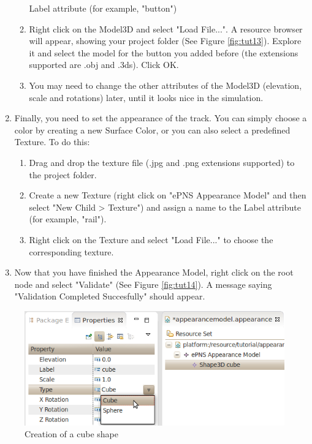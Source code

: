 \begin{enumerate}
\begin{enumerate}
    Label attribute (for example, "button")
    \item Right click on the Model3D and select "Load File...". A resource browser will appear, showing your project folder (See Figure 
    \ref{fig:tut13}). Explore it and select the model for the button you added before (the extensions supported are .obj and .3ds). Click OK.
    \item You may need to change the other attributes of the Model3D (elevation, scale and rotations) later, until it looks nice in 
    the simulation.
  \end{enumerate}
  \item Finally, you need to set the appearance of the track. You can simply choose a color by creating a new Surface Color, or you can also
  select a predefined Texture. To do this: 
  \begin{enumerate}
    \item Drag and drop the texture file (.jpg and .png extensions supported) to the project folder.
    \item Create a new Texture (right click on "ePNS Appearance Model" and then select "New Child > Texture") and assign a name to the 
    Label attribute (for example, "rail").
    \item Right click on the Texture and select "Load File..." to choose the corresponding texture.
  \end{enumerate}
  \item Now that you have finished the Appearance Model, right click on the root node and select "Validate" (See Figure \ref{fig:tut14}). 
  A message saying "Validation Completed Succesfully" should appear.
  \end{enumerate}

\begin{figure}[htp]
\begin{center}
  \includegraphics[width=12.0cm]{image/tutorial/Tutorial_10.png}
  \caption{Creation of a cube shape}
  \label{fig:tut10}
\end{center}
\end{figure}


